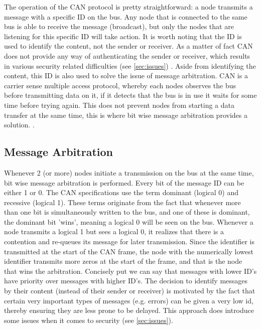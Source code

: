 The operation of the CAN protocol is pretty straightforward: a node transmits a message with a specific ID on the bus. Any node that is connected to the same bus is able to receive the message (broadcast), but only the nodes that are listening for this specific ID will take action. It is worth noting that the ID is used to identify the content, not the sender or receiver. As a matter of fact CAN does not provide any way of authenticating the sender or receiver, which results in various security related difficulties (see \ref{sec:issues}) . Aside from identifying the content, this ID is also used to solve the issue of message arbitration. CAN is a carrier sense multiple access protocol, whereby each nodes observes the bus before transmitting data on it, if it detects that the bus is in use it waits for some time before trying again. This does not prevent nodes from starting a data transfer at the same time, this is where bit wise message arbitration provides a solution. \cite{CANarbitration}.

\subsection{Message Arbitration}
\label{subsec:can:message_arbitration}

Whenever 2 (or more) nodes initiate a transmission on the bus at the same time, bit wise message arbitration is performed. Every bit of the message ID can be either 1 or 0. The CAN specifications use the term dominant (logical 0) and recessive (logical 1). These terms originate from the fact that whenever more than one bit is simultaneously written to the bus, and one of these is dominant, the dominant bit 'wins', meaning a logical 0 will be seen on the bus. Whenever a node transmits a logical 1 but sees a logical 0, it realizes that there is a contention and re-queues its message for later transmission. Since the identifier is transmitted at the start of the CAN frame, the node with the numerically lowest identifier transmits more zeros at the start of the frame, and that is the node that wins the arbitration. Concisely put we can say that messages with lower ID's have priority over messages with higher ID's. The decision to identify messages by their content (instead of their sender or receiver) is motivated by the fact that certain very important types of messages (e.g. errors) can be given a very low id, thereby ensuring they are less prone to be delayed. This approach does introduce some issues when it comes to security (see \ref{sec:issues}).


